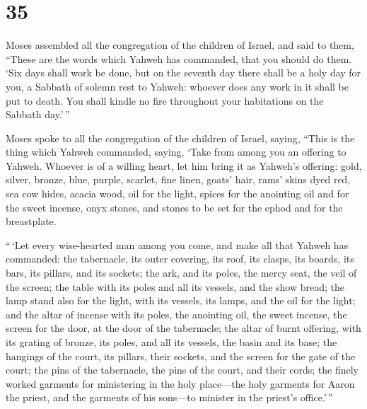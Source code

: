 \hypertarget{section-34}{%
\section{35}\label{section-34}}

 Moses assembled all the congregation of the children of
Israel, and said to them, ``These are the words which Yahweh has
commanded, that you should do them.  `Six days shall work be
done, but on the seventh day there shall be a holy day for you, a
Sabbath of solemn rest to Yahweh: whoever does any work in it shall be
put to death.  You shall kindle no fire throughout your
habitations on the Sabbath day.'\,''

 Moses spoke to all the congregation of the children of
Israel, saying, ``This is the thing which Yahweh commanded, saying,
 `Take from among you an offering to Yahweh. Whoever is of a
willing heart, let him bring it as Yahweh's offering: gold, silver,
bronze,  blue, purple, scarlet, fine linen, goats' hair,
 rams' skins dyed red, sea cow hides, acacia wood,
 oil for the light, spices for the anointing oil and for the
sweet incense,  onyx stones, and stones to be set for the
ephod and for the breastplate.

 ``\,`Let every wise-hearted man among you come, and make
all that Yahweh has commanded:  the tabernacle, its outer
covering, its roof, its clasps, its boards, its bars, its pillars, and
its sockets;  the ark, and its poles, the mercy seat, the
veil of the screen;  the table with its poles and all its
vessels, and the show bread;  the lamp stand also for the
light, with its vessels, its lamps, and the oil for the light;
 and the altar of incense with its poles, the anointing
oil, the sweet incense, the screen for the door, at the door of the
tabernacle;  the altar of burnt offering, with its grating
of bronze, its poles, and all its vessels, the basin and its base;
 the hangings of the court, its pillars, their sockets, and
the screen for the gate of the court;  the pins of the
tabernacle, the pins of the court, and their cords;  the
finely worked garments for ministering in the holy place---the holy
garments for Aaron the priest, and the garments of his sons---to
minister in the priest's office.'\,''

